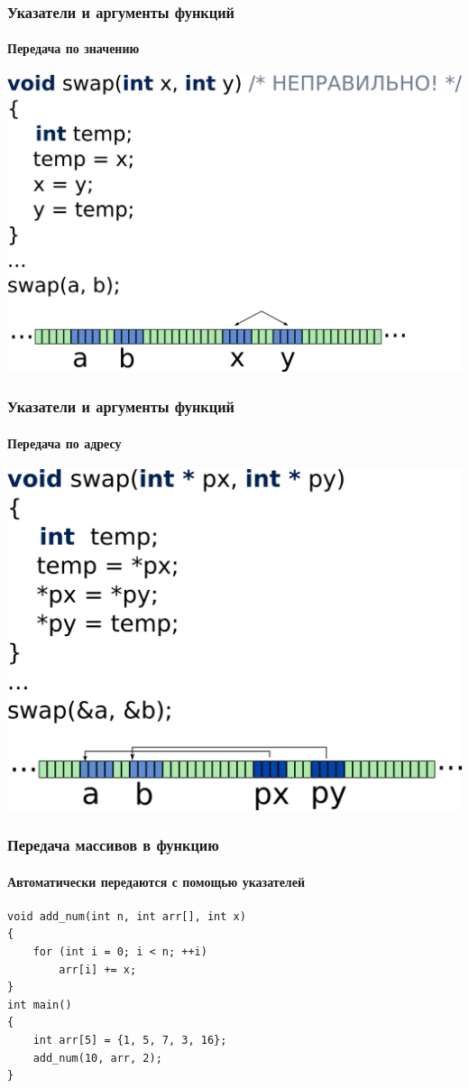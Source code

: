 \documentclass[12pt,pdf,hyperref={unicode}]{beamer}
\begin{document}
\begin{frame}[fragile]
\frametitle{Указатели и аргументы функций} 
\framesubtitle{Передача по значению}
\begin{center}
\includegraphics[height=0.55\linewidth]{images/swap_wrong.png}
\end{center}
\end{frame}

\begin{frame}[fragile]
\frametitle{Указатели и аргументы функций} 
\framesubtitle{Передача по адресу}
\begin{center}
\includegraphics[height=0.55\linewidth]{images/swap_right.png}
\end{center}
\end{frame}








\begin{frame}[fragile]
\frametitle{Передача массивов в функцию}
\framesubtitle{Автоматически передаются с помощью указателей}
\begin{lstlisting}
void add_num(int n, int arr[], int x)
{
    for (int i = 0; i < n; ++i)
        arr[i] += x;
}
int main()
{
    int arr[5] = {1, 5, 7, 3, 16};
    add_num(10, arr, 2);
}
\end{lstlisting}
\end{frame}
\end{document}
